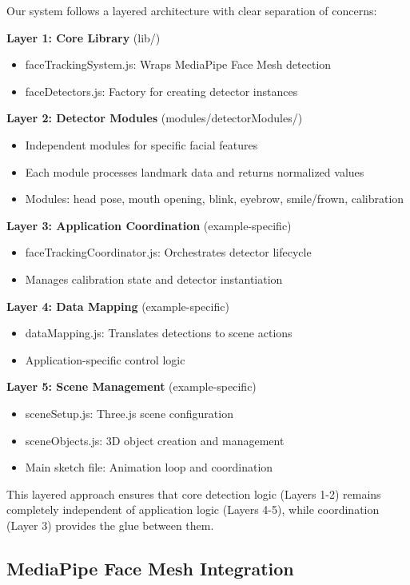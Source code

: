 \documentclass[sigconf]{acmart}
\begin{document}
Our system follows a layered architecture with clear separation of concerns:

\textbf{Layer 1: Core Library} (lib/)
\begin{itemize}
\item faceTrackingSystem.js: Wraps MediaPipe Face Mesh detection
\item faceDetectors.js: Factory for creating detector instances
\end{itemize}

\textbf{Layer 2: Detector Modules} (modules/detectorModules/)
\begin{itemize}
\item Independent modules for specific facial features
\item Each module processes landmark data and returns normalized values
\item Modules: head pose, mouth opening, blink, eyebrow, smile/frown, calibration
\end{itemize}

\textbf{Layer 3: Application Coordination} (example-specific)
\begin{itemize}
\item faceTrackingCoordinator.js: Orchestrates detector lifecycle
\item Manages calibration state and detector instantiation
\end{itemize}

\textbf{Layer 4: Data Mapping} (example-specific)
\begin{itemize}
\item dataMapping.js: Translates detections to scene actions
\item Application-specific control logic
\end{itemize}

\textbf{Layer 5: Scene Management} (example-specific)
\begin{itemize}
\item sceneSetup.js: Three.js scene configuration
\item sceneObjects.js: 3D object creation and management
\item Main sketch file: Animation loop and coordination
\end{itemize}

This layered approach ensures that core detection logic (Layers 1-2) remains completely independent of application logic (Layers 4-5), while coordination (Layer 3) provides the glue between them.

\subsection{MediaPipe Face Mesh Integration}
\end{document}
